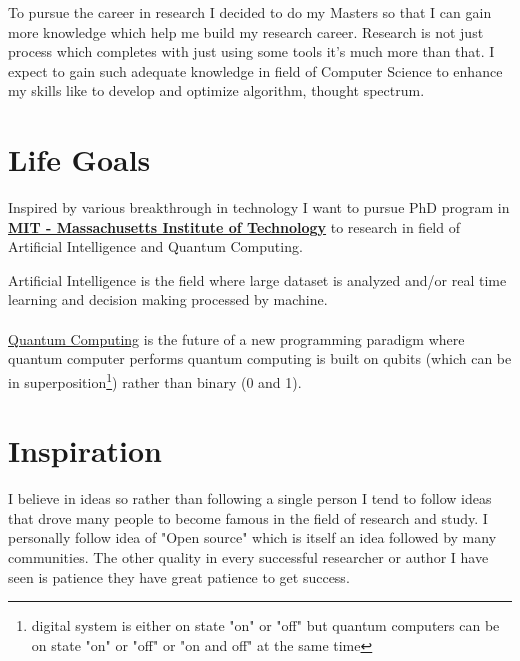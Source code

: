 \documentclass[a4paper, 14pt]{article}
\begin{document}
	To pursue the career in research I decided to do my Masters so that I can gain more knowledge which help me build my research career. Research is not just  process which completes with just using some tools it's much more than that. I expect to gain such adequate knowledge in field of Computer Science to enhance my skills like to develop and optimize algorithm, thought spectrum.

	\section*{Life Goals}
	Inspired by various breakthrough in technology I want to pursue PhD program in \href{http://www.mit.edu/about/}{\textbf{MIT - Massachusetts Institute of Technology}} to research in field of Artificial Intelligence and Quantum Computing.
	
	Artificial Intelligence is the field where large dataset is analyzed and/or real time learning and decision making processed by machine. \\
	\\
	\href{https://en.wikipedia.org/wiki/Quantum_computing}{Quantum Computing} is the future of a new programming paradigm where quantum computer performs quantum computing is built on qubits (which can be in superposition\footnote{digital system is either on state "on" or "off" but quantum computers can be on state "on" or "off" or "on and off" at the same time}) rather than binary (0 and 1). 

	\section*{Inspiration}
	I believe in ideas so rather than following a single person I tend to follow ideas that drove many people to become famous in the field of research and study. I personally follow idea of "Open source" which is itself an idea followed by many communities.
	The other quality in every successful researcher or author I have seen is patience they have great patience to get success.
\end{document}
